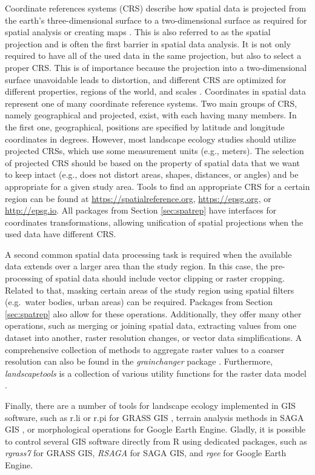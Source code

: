 \documentclass[smallextended]{svjour3}       %
\begin{document}
Coordinate references systems (CRS) describe how spatial data is projected from the earth's three-dimensional surface to a two-dimensional surface as required for spatial analysis or creating maps .
This is also referred to as the spatial projection and is often the first barrier in spatial data analysis.
It is not only required to have all of the used data in the same projection, but also to select a proper CRS.
This is of importance because the projection into a two-dimensional surface unavoidable leads to distortion, and different CRS are optimized for different properties, regions of the world, and scales .
Coordinates in spatial data represent one of many coordinate reference systems.
Two main groups of CRS, namely geographical and projected, exist, with each having many members.
In the first one, geographical, positions are specified by latitude and longitude coordinates in degrees.
However, most landscape ecology studies should utilize projected CRSs, which use some measurement units (e.g., meters).
The selection of projected CRS should be based on the property of spatial data that we want to keep intact (e.g., does not distort areas, shapes, distances, or angles) and be appropriate for a given study area.
Tools to find an appropriate CRS for a certain region can be found at \url{https://spatialreference.org}, \url{https://epsg.org}, or \url{http://epsg.io}.
All packages from Section \ref{sec:spatrep} have interfaces for coordinates transformations, allowing unification of spatial projections when the used data have different CRS.

A second common spatial data processing task is required when the available data extends over a larger area than the study region.
In this case, the pre-processing of spatial data should include vector clipping or raster cropping.
Related to that, masking certain areas of the study region using spatial filters (e.g.~water bodies, urban areas) can be required.
Packages from Section \ref{sec:spatrep} also allow for these operations.
Additionally, they offer many other operations, such as merging or joining spatial data, extracting values from one dataset into another, raster resolution changes, or vector data simplifications.
A comprehensive collection of methods to aggregate raster values to a coarser resolution can also be found in the \emph{grainchanger} package \cite{Graham2019}.
Furthermore, \emph{landscapetools} is a collection of various utility functions for the raster data model \cite{Sciaini2018}.

Finally, there are a number of tools for landscape ecology implemented in GIS software, such as r.li or r.pi for GRASS GIS \cite{wegmann2018r,neteler2012grass,Porta2017}, terrain analysis methods in SAGA GIS \cite{gmd-8-1991-2015}, or morphological operations for Google Earth Engine. Gladly, it is possible to control several GIS software directly from R using dedicated packages, such as \emph{rgrass7} \cite{R-grass7} for GRASS GIS, \emph{RSAGA} \cite{R-RSAGA} for SAGA GIS, and \emph{rgee} \cite{R-rgee} for Google Earth Engine.
\end{document}
